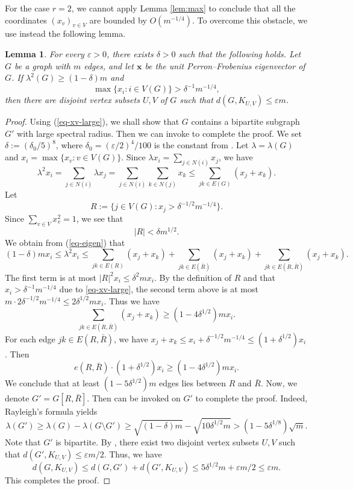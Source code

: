 \documentclass[11pt,a4paper]{article}
\newtheorem{lemma}[theorem]{Lemma}
\theoremstyle{definition}
\theoremstyle{remark}
\newcommand*{\abs}[1]{\lvert#1\rvert}
\begin{document}
For the case $r = 2$,  we cannot apply Lemma \ref{lem:max} to conclude that all the coordinates $(x_v)_{v\in V}$ are bounded by $O(m^{-1/4})$. To overcome this obstacle, we use instead the following lemma.

\begin{lemma} \label{lem:max-2}
For every $\varepsilon > 0$, there exists $\delta > 0$ such that the following holds. Let $G$ be a graph with $m$ edges, and let $\bm{x}$ be the unit Perron--Frobenius eigenvector of $G$. If $\lambda^2 (G) \ge (1 - \delta)m$ and 
\begin{equation} \label{eq-xv-large}
\max\{x_i : i\in V(G)\} > {\delta}^{-1} m^{-1/4}, 
\end{equation}
then there are disjoint vertex subsets $U, V$ of $G$ such that $d(G, K_{U, V}) \leq \varepsilon m$.
\end{lemma}

\begin{proof}
Using (\ref{eq-xv-large}), we shall show that $G$ contains a bipartite subgraph $G'$ with large spectral radius. Then we can invoke   to complete the proof. 
We set $\delta := (\delta_0/5)^8$,  
where $\delta_0=(\varepsilon/2)^4/100$ is the constant from . 
Let $\lambda = \lambda (G)$ and 
$x_i= \max\{x_v : v\in V(G)\}$. 
Since $\lambda x_i = \sum_{j\in N(i)} x_j$, we have 
\begin{equation}\label{eq-eigen}
  \lambda^2 x_i = \sum_{j\in N(i)} \lambda x_j= \sum_{j\in N(i)} 
\sum_{k\in N(j)} x_k \le \sum_{jk \in E(G)}(x_j +x_k). 
\end{equation}
Let 
$$R := \{ j\in V(G): x_j > \delta^{-1/2}m^{-1/4}\}.$$ 
Since 
$\sum_{v\in V} x_v^2 =1$, we see that 
\[ \abs{R} <  \delta m^{1/2}. \] 
We obtain from (\ref{eq-eigen}) that 
$$ (1-\delta)mx_i\le \lambda^2 x_i \leq \sum_{jk \in E(R)}(x_j +x_k) +  \sum_{ jk \in E(\bar{R})}(x_j +x_k) +  \sum_{jk \in E(R, \bar{R})}(x_j +x_k).$$
The first term is at most $\abs{R}^2 x_i \leq \delta^2 m x_i$. By the definition of $R$ and that $x_i > \delta^{-1}m^{-1/4}$ due to \eqref{eq-xv-large}, the second term above is at most $m \cdot 2\delta^{-1/2}m^{-1/4} \leq 2\delta^{1/2} m x_i$. Thus we have
$$\sum_{jk \in E(R, \bar{R})}(x_j +x_k) \geq (1 - 4\delta^{1/2}) m x_i.$$
For each edge $jk \in E(R, \bar{R})$, we have $x_j + x_k \leq x_i + \delta^{-1/2} m^{-1/4} \le 
(1 + \delta^{1/2})x_i$. Then 
\[ e(R,\bar{R})\cdot  (1+ \delta^{1/2})x_i 
\ge (1- 4\delta^{1/2} ) mx_i. \]
We conclude that at least $(1 - 5\delta^{1/2})m$ edges lies between $R$ and $\bar{R}$. Now, we denote $G'=G[R,\bar{R}]$. 
Then  can be invoked on $G'$ to complete the proof. 
Indeed, Rayleigh's formula yields 
\[ \lambda (G') \ge \lambda (G) - 
\lambda (G\setminus G') 
\ge \sqrt{(1-\delta) m} - \sqrt{10\delta^{1/2}m} 
> (1- 5\delta^{1/8}) \sqrt{m}. \]
Note that $G'$ is bipartite. 
By , 
there exist two disjoint vertex subsets $U,V$ such that $d(G',K_{U,V})\le \varepsilon m/2$. 
Thus, we have 
\[ d(G,K_{U,V}) \le d(G,G') + d(G',K_{U,V}) \le 5\delta^{1/2}m + \varepsilon m/2 \le \varepsilon m. \]
This completes the proof.
\end{proof}
\end{document}
